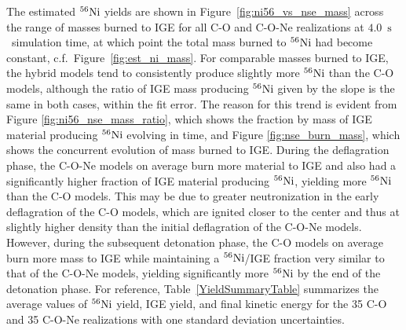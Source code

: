 \documentclass[iop,apj]{emulateapj}
\newcommand{\tabref}[1]{Table~\ref{#1}}
\newcommand{\figref}[1]{Figure~\ref{#1}}
\newcommand{\Ni}[1]{\ensuremath{{}^{#1}{\rm Ni}}}
\newcommand{\unitstyle}[1]{\ensuremath{\mathrm{#1}}}
\newcommand{\second}{\unitstyle{s}}
\newcommand{\erg}{\unitstyle{ergs}} %
\newcommand{\Msun}{\ensuremath{M_\odot}}
\begin{document}
The estimated \Ni{56} yields are shown in
\figref{fig:ni56_vs_nse_mass} across the range of masses burned to IGE
for all C-O and C-O-Ne realizations at $4.0$~\second\ simulation time,
at which point the total mass burned to \Ni{56} had become constant,
c.f.\ \figref{fig:est_ni_mass}. For comparable masses burned to IGE,
the hybrid models tend to consistently produce slightly more \Ni{56}
than the C-O models, although the ratio of IGE mass producing \Ni{56}
given by the slope is the same in both cases, within the fit error.
The reason for this trend is evident from Figure
\ref{fig:ni56_nse_mass_ratio}, which shows the fraction by mass of IGE
material producing \Ni{56} evolving in time, and Figure
\ref{fig:nse_burn_mass}, which shows the concurrent evolution of mass
burned to IGE. During the deflagration phase, the C-O-Ne models on
average burn more material to IGE and also had a significantly higher
fraction of IGE material producing \Ni{56}, yielding more \Ni{56} than
the C-O models. This may be due to greater neutronization in the early
deflagration of the C-O models, which are ignited closer to the center
and thus at slightly higher density than the initial deflagration of
the C-O-Ne models. However, during the subsequent detonation phase,
the C-O models on average burn more mass to IGE while maintaining a
\Ni{56}/IGE fraction very similar to that of the C-O-Ne models,
yielding significantly more \Ni{56} by the end of the detonation
phase.  For reference, \tabref{YieldSummaryTable} summarizes the
average values of \Ni{56} yield, IGE yield, and final kinetic energy
for the 35 C-O and 35 C-O-Ne realizations with one standard deviation
uncertainties.
\end{document}
